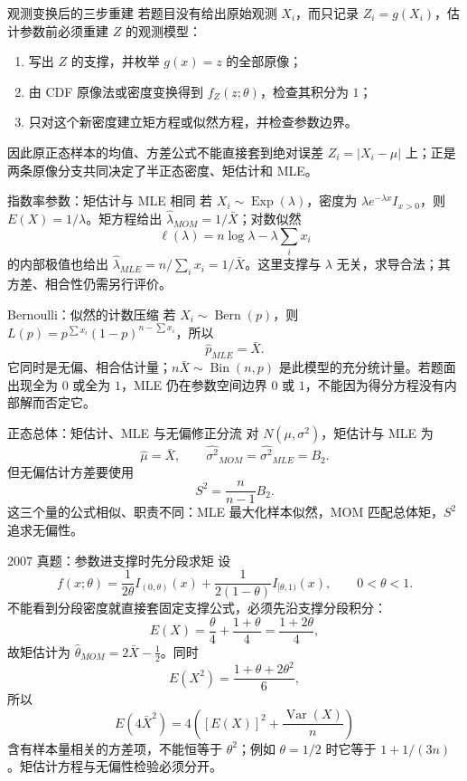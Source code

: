 \documentclass[11pt,a4paper]{ctexart}
\begin{document}
\begin{methodbox}{观测变换后的三步重建}
若题目没有给出原始观测 $X_i$，而只记录 $Z_i=g(X_i)$，估计参数前必须重建 $Z$ 的观测模型：
\begin{enumerate}
  \item 写出 $Z$ 的支撑，并枚举 $g(x)=z$ 的全部原像；
  \item 由 CDF 原像法或密度变换得到 $f_Z(z;\theta)$，检查其积分为 $1$；
  \item 只对这个新密度建立矩方程或似然方程，并检查参数边界。
\end{enumerate}
因此原正态样本的均值、方差公式不能直接套到绝对误差 $Z_i=|X_i-\mu|$ 上；正是两条原像分支共同决定了半正态密度、矩估计和 MLE。
\end{methodbox}

\begin{methodbox}{指数率参数：矩估计与 MLE 相同}
若 $X_i\sim\operatorname{Exp}(\lambda)$，密度为 $\lambda e^{-\lambda x}I_{x>0}$，则 $E(X)=1/\lambda$。矩方程给出 $\widehat\lambda_{MOM}=1/\bar X$；对数似然
\[
\ell(\lambda)=n\log\lambda-\lambda\sum_i x_i
\]
的内部极值也给出 $\widehat\lambda_{MLE}=n/\sum_i x_i=1/\bar X$。这里支撑与 $\lambda$ 无关，求导合法；其方差、相合性仍需另行评价。
\end{methodbox}

\begin{methodbox}{Bernoulli：似然的计数压缩}
若 $X_i\sim\operatorname{Bern}(p)$，则 $L(p)=p^{\sum x_i}(1-p)^{n-\sum x_i}$，所以
\[
\widehat p_{MLE}=\bar X.
\]
它同时是无偏、相合估计量；$n\bar X\sim\operatorname{Bin}(n,p)$ 是此模型的充分统计量。若题面出现全为 $0$ 或全为 $1$，MLE 仍在参数空间边界 $0$ 或 $1$，不能因为得分方程没有内部解而否定它。
\end{methodbox}

\begin{methodbox}{正态总体：矩估计、MLE 与无偏修正分流}
对 $N(\mu,\sigma^2)$，矩估计与 MLE 为
\[
\widehat\mu=\bar X,\qquad \widehat{\sigma^2}_{MOM}=\widehat{\sigma^2}_{MLE}=B_2.
\]
但无偏估计方差要使用
\[
S^2=\frac n{n-1}B_2.
\]
这三个量的公式相似、职责不同：MLE 最大化样本似然，MOM 匹配总体矩，$S^2$ 追求无偏性。
\end{methodbox}

\begin{examplebox}{2007 真题：参数进支撑时先分段求矩}
设
\[
f(x;\theta)=\frac1{2\theta}I_{(0,\theta)}(x)
 +\frac1{2(1-\theta)}I_{[\theta,1)}(x),
\qquad 0<\theta<1.
\]
不能看到分段密度就直接套固定支撑公式，必须先沿支撑分段积分：
\[
E(X)=\frac{\theta}{4}+\frac{1+\theta}{4}=\frac{1+2\theta}{4},
\]
故矩估计为 $\widehat\theta_{MOM}=2\bar X-\frac12$。同时
\[
E(X^2)=\frac{1+\theta+2\theta^2}{6},
\]
所以
\[
E(4\bar X^2)=4\left([E(X)]^2+\frac{\operatorname{Var}(X)}n\right)
\]
含有样本量相关的方差项，不能恒等于 $\theta^2$；例如 $\theta=1/2$ 时它等于 $1+1/(3n)$。矩估计方程与无偏性检验必须分开。
\end{examplebox}
\end{document}
